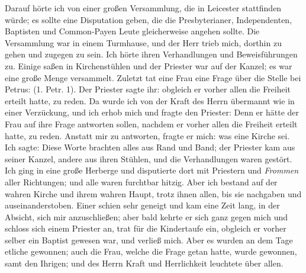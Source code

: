 Darauf hörte ich von einer großen Versammlung, die in
Leicester stattfinden würde; es sollte eine Disputation 
geben, die die Presbyterianer, 
Independenten, Baptisten 
und Common-Payen
Leute gleicherweise angehen sollte. Die Versammlung war in einem
Turmhause, und der Herr trieb mich, dorthin zu gehen und
zugegen zu sein. Ich hörte ihren Verhandlungen und 
Beweisführungen zu. Einige saßen in Kirchenstühlen und der Priester
war auf der Kanzel; es war eine große Menge versammelt.
Zuletzt tat eine Frau eine Frage über die Stelle bei Petrus:
(1. Petr. 1). Der Priester sagte ihr:
 obgleich er
vorher allen die Freiheit erteilt hatte, zu reden. Da wurde ich
von der Kraft des Herrn übermannt wie in einer Verzückung,
und ich erhob mich und fragte den Priester:  Denn er 
hätte der Frau auf ihre
Frage antworten sollen, nachdem er vorher allen die Freiheit
erteilt hatte, zu reden. Anstatt mir zu antworten, fragte er mich:
was eine Kirche sei. Ich sagte: 
Diese Worte brachten alles aus Rand und Band; der Priester
kam aus seiner Kanzel, andere aus ihren Stühlen, und die 
Verhandlungen waren gestört. Ich ging in eine große Herberge und
disputierte dort mit Priestern und \textit{Frommen} aller Richtungen;
und alle waren furchtbar hitzig. 
Aber ich bestand auf der wahren
Kirche und ihrem wahren Haupt, trotz ihnen allen, bis sie 
nachgaben und auseinanderstoben. Einer schien sehr geneigt und kam
eine Zeit lang, in der Absicht, sich mir anzuschließen; aber bald
kehrte er sich ganz gegen mich und schloss sich einem Priester an,
trat für die Kindertaufe ein, obgleich er vorher selber ein
Baptist gewesen war, und verließ mich. Aber es wurden an dem
Tage etliche gewonnen; auch die Frau, welche die Frage getan
hatte, wurde gewonnen, samt den Ihrigen; und des Herrn Kraft
und Herrlichkeit leuchtete über allen.

